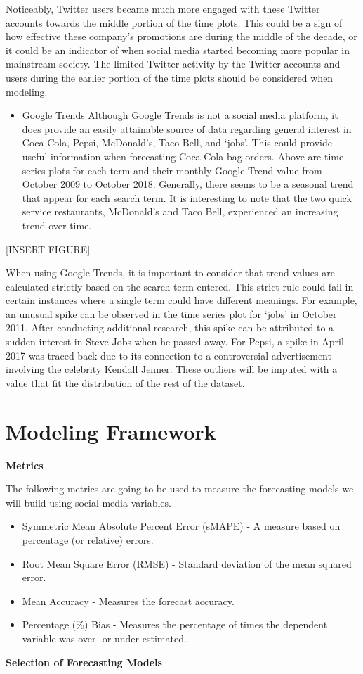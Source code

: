 \documentclass[12pt,oneside]{chicagocapstone}
\providecommand{\tightlist}{%
  \setlength{\itemsep}{0pt}\setlength{\parskip}{0pt}}
\begin{document}
Noticeably, Twitter users became much more engaged with these Twitter accounts towards the middle portion of the time plots. This could be a sign of how effective these company's promotions are during the middle of the decade, or it could be an indicator of when social media started becoming more popular in mainstream society. The limited Twitter activity by the Twitter accounts and users during the earlier portion of the time plots should be considered when modeling.
\begin{itemize}
\tightlist
\item
  Google Trends
  Although Google Trends is not a social media platform, it does provide an easily attainable source of data regarding general interest in Coca-Cola, Pepsi, McDonald's, Taco Bell, and `jobs'. This could provide useful information when forecasting Coca-Cola bag orders.
  Above are time series plots for each term and their monthly Google Trend value from October 2009 to October 2018. Generally, there seems to be a seasonal trend that appear for each search term. It is interesting to note that the two quick service restaurants, McDonald's and Taco Bell, experienced an increasing trend over time.
\end{itemize}
{[}INSERT FIGURE{]}

When using Google Trends, it is important to consider that trend values are calculated strictly based on the search term entered. This strict rule could fail in certain instances where a single term could have different meanings. For example, an unusual spike can be observed in the time series plot for `jobs' in October 2011. After conducting additional research, this spike can be attributed to a sudden interest in Steve Jobs when he passed away. For Pepsi, a spike in April 2017 was traced back due to its connection to a controversial advertisement involving the celebrity Kendall Jenner. These outliers will be imputed with a value that fit the distribution of the rest of the dataset.

\newpage

\hypertarget{methodology-modeling}{%
\section*{Modeling Framework}\label{methodology-modeling}}

\textbf{Metrics}

The following metrics are going to be used to measure the forecasting models we will build using social media variables.
\begin{itemize}
\item
  Symmetric Mean Absolute Percent Error (sMAPE) - A measure based on percentage (or relative) errors.
\item
  Root Mean Square Error (RMSE) - Standard deviation of the mean squared error.
\item
  Mean Accuracy - Measures the forecast accuracy.
\item
  Percentage (\%) Bias - Measures the percentage of times the dependent variable was over- or under-estimated.
\end{itemize}
\textbf{Selection of Forecasting Models}
\end{document}
